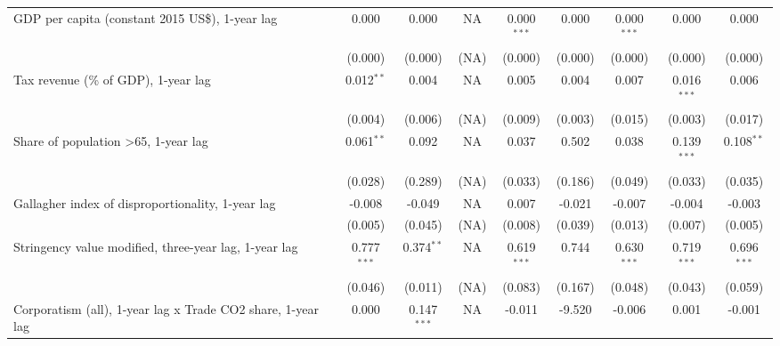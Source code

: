 \begin{table}[htbp]
\begin{tabular}{lcccccccc}
      GDP per capita (constant 2015 US\$), 1-year lag             & 0.000         & 0.000                     & NA           & 0.000$^{***}$  & 0.000            & 0.000$^{***}$   & 0.000           & 0.000\\   
                                                                  & (0.000)       & (0.000)                   & (NA)         & (0.000)        & (0.000)          & (0.000)         & (0.000)         & (0.000)\\   
      Tax revenue (\% of GDP), 1-year lag                         & 0.012$^{**}$  & 0.004                     & NA           & 0.005          & 0.004            & 0.007           & 0.016$^{***}$   & 0.006\\   
                                                                  & (0.004)       & (0.006)                   & (NA)         & (0.009)        & (0.003)          & (0.015)         & (0.003)         & (0.017)\\   
      Share of population >65, 1-year lag                         & 0.061$^{**}$  & 0.092                     & NA           & 0.037          & 0.502            & 0.038           & 0.139$^{***}$   & 0.108$^{**}$\\   
                                                                  & (0.028)       & (0.289)                   & (NA)         & (0.033)        & (0.186)          & (0.049)         & (0.033)         & (0.035)\\   
      Gallagher index of disproportionality, 1-year lag           & -0.008        & -0.049                    & NA           & 0.007          & -0.021           & -0.007          & -0.004          & -0.003\\   
                                                                  & (0.005)       & (0.045)                   & (NA)         & (0.008)        & (0.039)          & (0.013)         & (0.007)         & (0.005)\\   
      Stringency value modified, three-year lag, 1-year lag       & 0.777$^{***}$ & 0.374$^{**}$              & NA           & 0.619$^{***}$  & 0.744            & 0.630$^{***}$   & 0.719$^{***}$   & 0.696$^{***}$\\   
                                                                  & (0.046)       & (0.011)                   & (NA)         & (0.083)        & (0.167)          & (0.048)         & (0.043)         & (0.059)\\   
      Corporatism (all), 1-year lag x Trade CO2 share, 1-year lag & 0.000         & 0.147$^{***}$             & NA           & -0.011         & -9.520           & -0.006          & 0.001           & -0.001\\   

\end{tabular}
\end{table}
